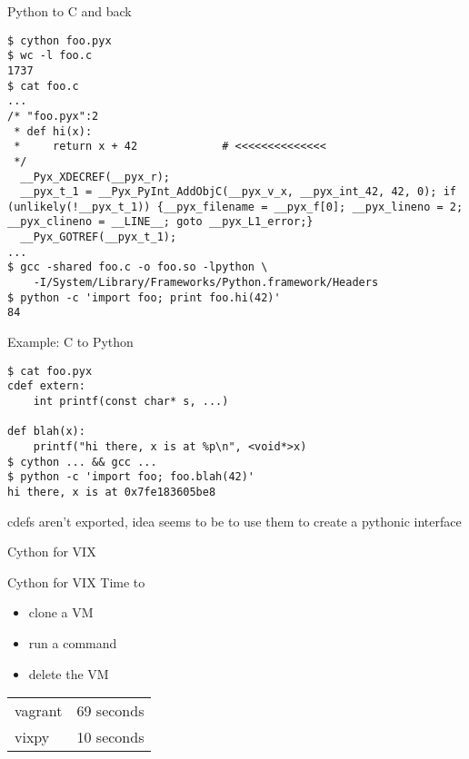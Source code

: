 \documentclass[xcolor=svgnames,17pt]{beamer}
\newcommand*{\sizefont}[1]{%
    \ifcase#1\relax
    \or \tiny
    \or \scriptsize
    \or \footnotesize
    \or \small
    \or \normalsize
    \or \large
    \or \Large
    \or \LARGE
    \or \huge
    \or \Huge
    \fi}
\begin{document}
\begin{frame}[fragile]{Python to C and back}

\sizefont 2
\begin{verbatim}
$ cython foo.pyx
$ wc -l foo.c
1737
$ cat foo.c
...
/* "foo.pyx":2
 * def hi(x):
 *     return x + 42             # <<<<<<<<<<<<<<
 */
  __Pyx_XDECREF(__pyx_r);
  __pyx_t_1 = __Pyx_PyInt_AddObjC(__pyx_v_x, __pyx_int_42, 42, 0); if (unlikely(!__pyx_t_1)) {__pyx_filename = __pyx_f[0]; __pyx_lineno = 2; __pyx_clineno = __LINE__; goto __pyx_L1_error;}
  __Pyx_GOTREF(__pyx_t_1);
...
$ gcc -shared foo.c -o foo.so -lpython \
    -I/System/Library/Frameworks/Python.framework/Headers
$ python -c 'import foo; print foo.hi(42)'
84
\end{verbatim}

\end{frame}

\begin{frame}[fragile]{Example: C to Python}
\sizefont 3
\begin{verbatim}
$ cat foo.pyx
cdef extern:
    int printf(const char* s, ...)

def blah(x):
    printf("hi there, x is at %p\n", <void*>x)
$ cython ... && gcc ...
$ python -c 'import foo; foo.blah(42)'
hi there, x is at 0x7fe183605be8
\end{verbatim}

\pause
\normalsize

cdefs aren’t exported, idea seems to be to use them to create a pythonic
interface
\end{frame}

\begin{frame}{Cython for VIX}
 \\
\pause
\centering
\vspace*{1.5\baselineskip}
\href{https://github.com/andrewdotn/vixpy}{}
\end{frame}

\begin{frame}{Cython for VIX}
Time to
\begin{itemize}
\item clone a VM
\item run a command
\item delete the VM
\end{itemize}

\vspace\baselineskip

\begin{tabular}{lr}
vagrant & 69 seconds \\
\pause
vixpy & 10 seconds
\end{tabular}

\end{frame}
\end{document}
